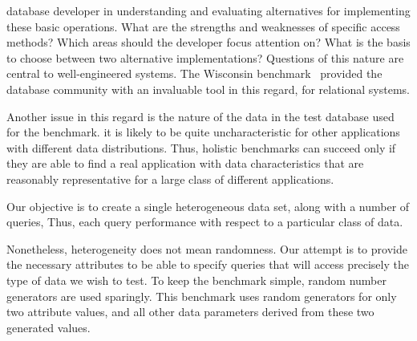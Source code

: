 database developer in understanding and evaluating 
alternatives for implementing these basic operations. 
What are the strengths and weaknesses of specific access methods?  Which areas should the developer focus attention on?  What is the basis to choose between two alternative implementations?  Questions of this nature are central to well-engineered systems.     
The Wisconsin benchmark~\cite{wiss} provided
the database community with an invaluable tool in this regard, for
relational systems.  

Another issue in this regard is the nature of the data in the test database used for the benchmark. 
  it is likely to be quite
uncharacteristic for other applications with different data
distributions.  Thus, holistic benchmarks can succeed only if they are able to find a real application with data characteristics that are reasonably representative for a large class of different applications.  

Our objective is to create a single heterogeneous data set, along with
a number of queries,    Thus, each query   performance with respect to a particular class of data.

Nonetheless, heterogeneity does not mean randomness.  Our attempt is to
provide the necessary attributes to be able to specify queries that
will access precisely the type of data we wish to test.  To keep
the benchmark simple, random number
generators are used sparingly.  This  
benchmark uses random generators for only two attribute values, and all other data
parameters derived from these two generated values.

